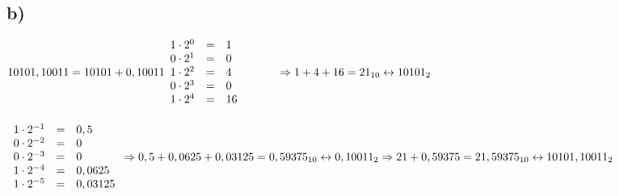 \documentclass[a4paper]{scrartcl}
\begin{document}
	\subsection{b)}
		\(
		10101,10011 = 10101+0,10011 \\ \\
		\begin{array}{rclcl}
			1\cdot 2^0 &=& 1 \\
			0\cdot 2^1 &=& 0 \\
			1\cdot 2^2 &=& 4 \\
			0\cdot 2^3 &=& 0 \\			
			1\cdot 2^4 &=& 16 \\
		\end{array}
		\quad\quad\quad\Rightarrow 1+4+16 = 21_{10}\leftrightarrow 10101_2 \\
		\)\\ \\
		\(
		\begin{array}{rclcl}
			1\cdot 2^{-1} &=& 0,5 \\
			0\cdot 2^{-2} &=& 0 \\
			0\cdot 2^{-3} &=& 0 \\
			1\cdot 2^{-4} &=& 0,0625 \\
			1\cdot 2^{-5} &=& 0,03125 \\
		\end{array}
		\Rightarrow 0,5+0,0625+0,03125 = 0,59375_{10}\leftrightarrow 0,10011_2 \\ \\ \\
		\Rightarrow 21+0,59375 = 21,59375_{10} \leftrightarrow 10101,10011_2 \\
		\)
	
	
\end{document}
